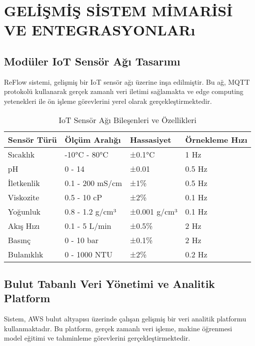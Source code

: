 \documentclass[12pt,a4paper]{article}
\begin{document}
\section{GELİŞMİŞ SİSTEM MİMARİSİ VE ENTEGRASYONLARı}

\subsection{Modüler IoT Sensör Ağı Tasarımı}

ReFlow sistemi, gelişmiş bir IoT sensör ağı üzerine inşa edilmiştir. Bu ağ, MQTT protokolü kullanarak gerçek zamanlı veri iletimi sağlamakta ve edge computing yetenekleri ile ön işleme görevlerini yerel olarak gerçekleştirmektedir.

\begin{table}[h]
\centering
\caption{IoT Sensör Ağı Bileşenleri ve Özellikleri}
\begin{tabular}{llll}
\toprule
\textbf{Sensör Türü} & \textbf{Ölçüm Aralığı} & \textbf{Hassasiyet} & \textbf{Örnekleme Hızı} \\
\midrule
Sıcaklık & -10°C - 80°C & ±0.1°C & 1 Hz \\
pH & 0 - 14 & ±0.01 & 0.5 Hz \\
İletkenlik & 0.1 - 200 mS/cm & ±1\% & 0.5 Hz \\
Viskozite & 0.5 - 10 cP & ±2\% & 0.1 Hz \\
Yoğunluk & 0.8 - 1.2 g/cm³ & ±0.001 g/cm³ & 0.1 Hz \\
Akış Hızı & 0.1 - 5 L/min & ±0.5\% & 2 Hz \\
Basınç & 0 - 10 bar & ±0.1\% & 2 Hz \\
Bulanıklık & 0 - 1000 NTU & ±2\% & 0.2 Hz \\
\bottomrule
\end{tabular}
\end{table}

\subsection{Bulut Tabanlı Veri Yönetimi ve Analitik Platform}

Sistem, AWS bulut altyapısı üzerinde çalışan gelişmiş bir veri analitik platformu kullanmaktadır. Bu platform, gerçek zamanlı veri işleme, makine öğrenmesi model eğitimi ve tahminleme görevlerini gerçekleştirmektedir.
\end{document}
